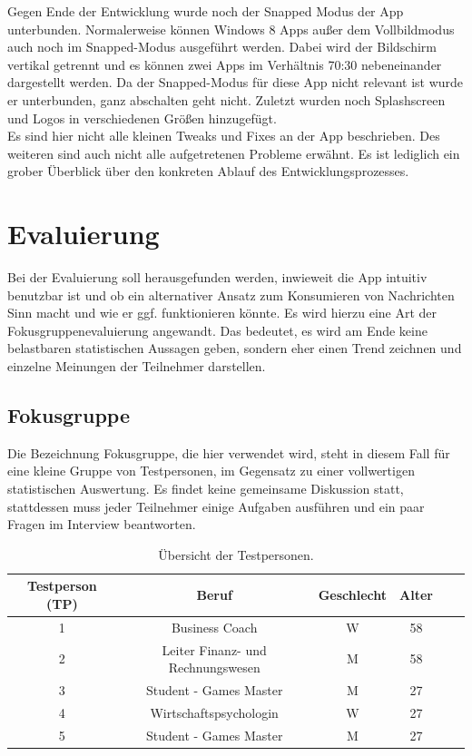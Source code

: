 \documentclass[12pt,a4paper,bibtotoc,abstracton]{scrartcl}
\begin{document}
Gegen Ende der Entwicklung wurde noch der Snapped Modus der App unterbunden. Normalerweise können Windows 8 Apps außer dem Vollbildmodus auch noch im Snapped-Modus ausgeführt werden. Dabei wird der Bildschirm vertikal getrennt und es können zwei Apps im Verhältnis 70:30 nebeneinander dargestellt werden. Da der Snapped-Modus für diese App nicht relevant ist wurde er unterbunden, ganz abschalten geht nicht. Zuletzt wurden noch Splashscreen und Logos in verschiedenen Größen hinzugefügt.\\

Es sind hier nicht alle kleinen Tweaks und Fixes an der App beschrieben. Des weiteren sind auch nicht alle aufgetretenen Probleme erwähnt. Es ist lediglich ein grober Überblick über den konkreten Ablauf des Entwicklungsprozesses. 

\newpage
\section{Evaluierung} 
\label{sec:evaluierung}
Bei der Evaluierung soll herausgefunden werden, inwieweit die App intuitiv benutzbar ist und ob ein alternativer Ansatz zum Konsumieren von Nachrichten Sinn macht und wie er ggf. funktionieren könnte. Es wird hierzu eine Art der Fokusgruppenevaluierung angewandt. Das bedeutet, es wird am Ende keine belastbaren statistischen Aussagen geben, sondern eher einen Trend zeichnen und einzelne Meinungen der Teilnehmer darstellen.

\subsection{Fokusgruppe}
\label{subsec:fokusgruppe}
Die Bezeichnung \glqq Fokusgruppe\grqq, die hier verwendet wird, steht in diesem Fall für eine kleine Gruppe von Testpersonen, im Gegensatz zu einer vollwertigen statistischen Auswertung. Es findet keine gemeinsame Diskussion statt, stattdessen muss jeder Teilnehmer einige Aufgaben ausführen und ein paar Fragen im Interview beantworten.


\begin{table}[h]
\centering
\begin{tabular}{|c|c|c|c|c|c|}
\hline 
\rule[-1ex]{0pt}{3.5ex} \textbf{Testperson (TP)} & \textbf{Beruf} & \textbf{Geschlecht} & \textbf{Alter} \\ 
\hline 
\rule[-1ex]{0pt}{2.5ex} 1 & Business Coach & W & 58 \\ 
\hline 
\rule[-1ex]{0pt}{2.5ex} 2 & Leiter Finanz- und Rechnungswesen & M & 58 \\ 
\hline 
\rule[-1ex]{0pt}{2.5ex} 3 & Student - Games Master & M & 27  \\ 
\hline 
\rule[-1ex]{0pt}{2.5ex} 4 & Wirtschaftspsychologin & W & 27 \\ 
\hline 
\rule[-1ex]{0pt}{2.5ex} 5 & Student - Games Master & M & 27 \\ 
\hline 
\end{tabular} 
\caption{Übersicht der Testpersonen.}
\label{tab:testpersonen}
\end{table}
\end{document}
